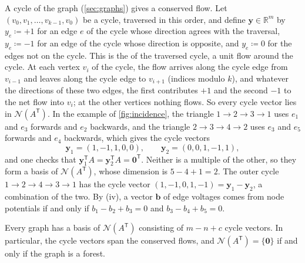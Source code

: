 A cycle of the graph (\cref{sec:graphs}) gives a conserved flow. Let $(v_0,v_1,\ldots,v_{k-1},v_0)$ be a cycle, traversed in this order, and define $\mathbf y\in\mathbb R^m$ by $y_e\coloneqq+1$ for an edge $e$ of the cycle whose direction agrees with the traversal, $y_e\coloneqq-1$ for an edge of the cycle whose direction is opposite, and $y_e\coloneqq0$ for the edges not on the cycle. This is the  of the traversed cycle, a unit flow around the cycle. At each vertex $v_i$ of the cycle, the flow arrives along the cycle edge from $v_{i-1}$ and leaves along the cycle edge to $v_{i+1}$ (indices modulo $k$), and whatever the directions of these two edges, the first contributes $+1$ and the second $-1$ to the net flow into $v_i$; at the other vertices nothing flows. So every cycle vector lies in $\mathcal N(A^{\mathsf T})$. In the example of \cref{fig:incidence}, the triangle $1\to2\to3\to1$ uses $e_1$ and $e_3$ forwards and $e_2$ backwards, and the triangle $2\to3\to4\to2$ uses $e_3$ and $e_5$ forwards and $e_4$ backwards, which gives the cycle vectors
\[
\mathbf y_1=(1,-1,1,0,0),\qquad\mathbf y_2=(0,0,1,-1,1),
\]
and one checks that $\mathbf y_1^{\mathsf T}A=\mathbf y_2^{\mathsf T}A=\mathbf 0^{\mathsf T}$. Neither is a multiple of the other, so they form a basis of $\mathcal N(A^{\mathsf T})$, whose dimension is $5-4+1=2$. The outer cycle $1\to2\to4\to3\to1$ has the cycle vector $(1,-1,0,1,-1)=\mathbf y_1-\mathbf y_2$, a combination of the two. By (iv), a vector $\mathbf b$ of edge voltages comes from node potentials if and only if $b_1-b_2+b_3=0$ and $b_3-b_4+b_5=0$.

\begin{proposition}
\label{prop:cycle-basis}
Every graph has a basis of $\mathcal N(A^{\mathsf T})$ consisting of $m-n+c$ cycle vectors. In particular, the cycle vectors span the conserved flows, and $\mathcal N(A^{\mathsf T})=\{\mathbf 0\}$ if and only if the graph is a forest.
\end{proposition}

